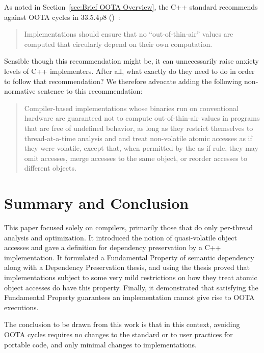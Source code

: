 As noted in Section~\ref{sec:Brief OOTA Overview}, the C++
standard recommends against OOTA cycles in 33.5.4p8
()~\cite{ThomasKoeppe2023N4950}:
\begin{quote}
	Implementations should ensure that no ``out-of-thin-air'' values
	are computed that circularly depend on their own computation.
\end{quote}

Sensible though this recommendation might be, it can unnecessarily raise
anxiety levels of C++ implementers.
After all, what exactly do they need to do in order to follow that
recommendation?
We therefore advocate adding the following non-normative sentence to this
recommendation:
\begin{quote}
	Compiler-based implementations whose binaries run on conventional
	hardware are guaranteed not to compute out-of-thin-air values in
	programs that are free of undefined behavior,
	as long as they restrict themselves to thread-at-a-time analysis
	and and treat non-volatile atomic accesses as if they were
	volatile, except that, when permitted by the as-if rule, they
	may omit accesses, merge accesses to the same object, or reorder
	accesses to different objects.
\end{quote}

\section{Summary and Conclusion}
\label{sec:Summary and Conclusion}

This paper focused solely on compilers, primarily those that do only
per-thread analysis and optimization.
It introduced the notion of quasi-volatile object accesses and gave
a definition for dependency preservation by a C++ implementation.
It formulated a Fundamental Property of semantic dependency along with
a Dependency Preservation thesis, and using the thesis proved
that implementations subject to some very mild restrictions on how
they treat atomic object accesses do have this property.
Finally, it demonstrated that satisfying the Fundamental Property
guarantees an implementation cannot give rise to OOTA executions.

The conclusion to be drawn from this work is that in this context,
avoiding OOTA cycles requires no changes to the standard
or to user practices for portable code, and only minimal changes to
implementations.

